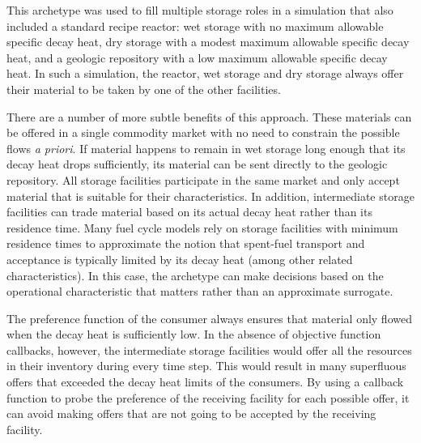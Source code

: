 This archetype was used to fill multiple storage roles in a simulation that
also included a standard recipe reactor: wet storage with no maximum allowable
specific decay heat, dry storage with a modest maximum allowable specific
decay heat, and a geologic repository with a low maximum allowable specific
decay heat.  In such a simulation, the reactor, wet storage and dry storage
always offer their material to be taken by one of the other facilities.

There are a number of more subtle benefits of this approach.  These materials
can be offered in a single commodity market with no need to constrain the
possible flows \textit{a priori}.  If material happens to remain in wet
storage long enough that its decay heat drops sufficiently, its material can
be sent directly to the geologic repository.  All storage facilities
participate in the same market and only accept material that is suitable for
their characteristics.  In addition, intermediate storage facilities can trade
material based on its actual decay heat rather than its residence time.  Many
fuel cycle models rely on storage facilities with minimum residence times to
approximate the notion that spent-fuel transport and acceptance is typically
limited by its decay heat (among other related characteristics).  In this
case, the archetype can make decisions based on the operational characteristic
that matters rather than an approximate surrogate.

The preference function of the consumer always ensures that material only
flowed when the decay heat is sufficiently low.  In the absence of objective
function callbacks, however, the intermediate storage facilities would offer
all the resources in their inventory during every time step.  This would
result in many superfluous offers that exceeded the decay heat limits of the
consumers.  By using a callback function to probe the preference of the
receiving facility for each possible offer, it can avoid making offers that
are not going to be accepted by the receiving facility.

 
